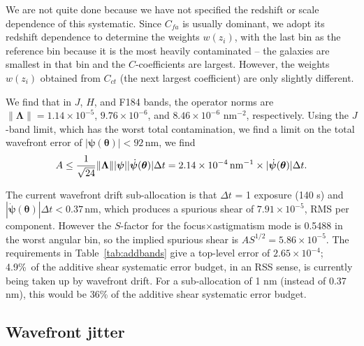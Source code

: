 \documentclass[aps,prd, amsmath,amssymb,superscriptaddress,showkeys,nofootinbib,reprint,preprintnumbers]{revtex4-1}
\begin{document}
\begin{widetext}
We are not quite done because we have not specified the redshift or
scale dependence of this systematic. Since $C_{fa}$ is usually
dominant, we adopt its redshift dependence to determine the weights
$w(z_i)$, with the last bin as the reference bin because it is the
most heavily contaminated -- the galaxies are smallest in that bin and
the $C$-coefficients are largest. However, the weights $w(z_i)$
obtained from $C_{ct}$ (the next largest coefficient) are only
slightly different.

We find that in $J$, $H$, and F184 bands, the operator norms are $\lVert{\boldsymbol\Lambda}\rVert = 1.14\times 10^{-5}$, $9.76\times 10^{-6}$, and $8.46\times 10^{-6}$ nm$^{-2}$, respectively. Using the $J$-band limit, which has the worst total contamination, we find a limit on the total wavefront error of
$|{\boldsymbol\psi}({\boldsymbol\theta})|<92\,$nm, we find
\begin{equation}
A \le \frac1{\sqrt{24}}\lVert{\boldsymbol\Lambda} \rVert |{\boldsymbol\psi}| |\dot{\boldsymbol\psi}({\boldsymbol\theta})| \Delta t
= 2.14\times 10^{-4}\, {\rm nm}^{-1}\times |\dot{\boldsymbol\psi}({\boldsymbol\theta})| \Delta t.
\end{equation}

The current wavefront drift sub-allocation is that $\Delta t$ = 1 exposure
(140 s) and $|\dot{\boldsymbol\psi}({\boldsymbol\theta})| \Delta
t<0.37\,$nm, which produces a spurious shear of $7.91\times 10^{-5}$,
RMS per component. However the $S$-factor for the
focus$\times$astigmatism mode is 0.5488 in the worst angular bin, so the
implied spurious shear is $AS^{1/2} = 5.86\times 10^{-5}$. The
requirements in Table~\ref{tab:addbands} give a top-level error of
$2.65\times 10^{-4}$; 4.9\%\ of the additive shear systematic error budget, in
an RSS sense, is currently being taken up by wavefront drift. For a sub-allocation of 1 nm (instead of 0.37 nm), this would be 36\% of the additive shear systematic error budget.

\subsection{Wavefront jitter}
\label{as:a-wfjitter}


\end{widetext}
\end{document}
